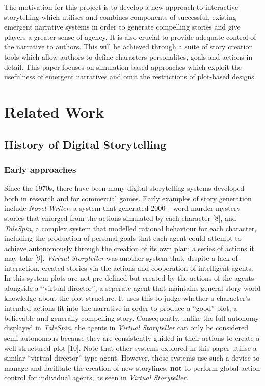 \documentclass{sig-alternate-05-2015}
\begin{document}
\noindent The motivation for this project is to develop a new approach to interactive storytelling which utilises and combines components of successful, existing emergent narrative systems in order to generate compelling stories and give players a greater sense of agency. It is also crucial to provide adequate control of the narrative to authors. This will be achieved through a suite of story creation tools which allow authors to define characters personalites, goals and actions in detail. This paper focuses on simulation-based approaches which exploit the usefulness of emergent narratives and omit the restrictions of plot-based designs.

\section{Related Work}
\subsection{History of Digital Storytelling}
\subsubsection{Early approaches}
Since the 1970s, there have been many digital storytelling systems developed both in research and for commercial games. Early examples of story generation include \textit{Novel Writer}, a system that generated 2000+ word murder mystery stories that emerged from the actions simulated by each character [8], and \textit{TaleSpin}, a complex system that modelled rational behaviour for each character, including the production of personal goals that each agent could attempt to achieve autonomously through the creation of its own plan; a series of actions it may take [9]. \textit{Virtual Storyteller} was another system that, despite a lack of interaction, created stories via the actions and cooperation of intelligent agents. In this system plots are not pre-defined but created by the actions of the agents alongside a ``virtual director''; a seperate agent that maintains general story-world knowledge about the plot structure. It uses this to judge whether a character's intended actions fit into the narrative in order to produce a ``good'' plot; a believable and generally compelling story. Consequently, unlike the full-autonomy displayed in \textit{TaleSpin}, the agents in \textit{Virtual Storyteller} can only be considered semi-autonomous because they are consistently guided in their actions to create a well-structured plot [10]. Note that other systems explored in this paper utilise a similar ``virtual director'' type agent. However, those systems use such a device to manage and facilitate the creation of new storylines, \textbf{not} to perform global action control for individual agents, as seen in \textit{Virtual Storyteller}.\\
\end{document}
